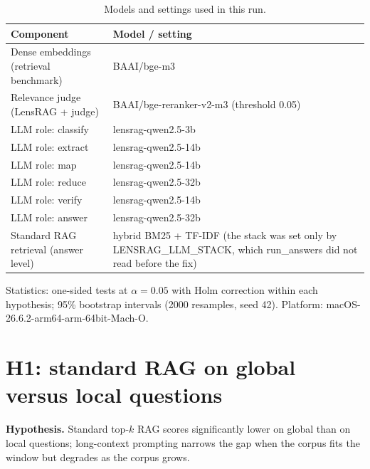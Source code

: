 \documentclass[11pt]{article}
\begin{document}
\begin{table}[htbp]
\centering\small
\caption{Models and settings used in this run.}
\label{tab:models}
\begin{tabular}{ll}
\toprule
Component & Model / setting \\
\midrule
Dense embeddings (retrieval benchmark) & BAAI/bge-m3 \\
Relevance judge (LensRAG + judge) & BAAI/bge-reranker-v2-m3 (threshold 0.05) \\
LLM role: classify & lensrag-qwen2.5-3b \\
LLM role: extract & lensrag-qwen2.5-14b \\
LLM role: map & lensrag-qwen2.5-14b \\
LLM role: reduce & lensrag-qwen2.5-32b \\
LLM role: verify & lensrag-qwen2.5-14b \\
LLM role: answer & lensrag-qwen2.5-32b \\
Standard RAG retrieval (answer level) & hybrid BM25 + TF-IDF (the stack was set only by LENSRAG\_LLM\_STACK, which run\_answers did not read before the fix) \\
\bottomrule
\end{tabular}
\par\smallskip\parbox{0.95\linewidth}{\footnotesize Statistics: one-sided tests at $\alpha=0.05$ with Holm correction within each hypothesis; 95\% bootstrap intervals (2000 resamples, seed 42). Platform: macOS-26.6.2-arm64-arm-64bit-Mach-O.}
\end{table}

\section{H1: standard RAG on global versus local questions}

\textbf{Hypothesis.} Standard top-$k$ RAG scores significantly lower on global than on local questions; long-context prompting narrows the gap when the corpus fits the window but degrades as the corpus grows.
\end{document}

